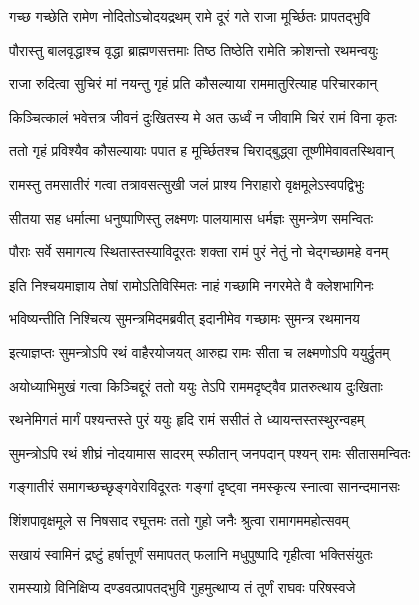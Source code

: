 \twolineshloka
{गच्छ गच्छेति रामेण नोदितोऽचोदयद्रथम्}
{रामे दूरं गते राजा मूर्च्छितः प्रापतद्भुवि} %

\twolineshloka
{पौरास्तु बालवृद्धाश्च वृद्धा ब्राह्मणसत्तमाः}
{तिष्ठ तिष्ठेति रामेति क्रोशन्तो रथमन्वयुः} %

\twolineshloka
{राजा रुदित्वा सुचिरं मां नयन्तु गृहं प्रति}
{कौसल्याया राममातुरित्याह परिचारकान्} %

\twolineshloka
{किञ्चित्कालं भवेत्तत्र जीवनं दुःखितस्य मे}
{अत ऊर्ध्वं न जीवामि चिरं रामं विना कृतः} %

\twolineshloka
{ततो गृहं प्रविश्यैव कौसल्यायाः पपात ह}
{मूर्च्छितश्च चिराद्बुद्ध्वा तूष्णीमेवावतस्थिवान्} %

\twolineshloka
{रामस्तु तमसातीरं गत्वा तत्रावसत्सुखी}
{जलं प्राश्य निराहारो वृक्षमूलेऽस्वपद्विभुः} %

\twolineshloka
{सीतया सह धर्मात्मा धनुष्पाणिस्तु लक्ष्मणः}
{पालयामास धर्मज्ञः सुमन्त्रेण समन्वितः} %

\twolineshloka
{पौराः सर्वे समागत्य स्थितास्तस्याविदूरतः}
{शक्ता रामं पुरं नेतुं नो चेद्गच्छामहे वनम्} %

\twolineshloka
{इति निश्चयमाज्ञाय तेषां रामोऽतिविस्मितः}
{नाहं गच्छामि नगरमेते वै क्लेशभागिनः} %

\twolineshloka
{भविष्यन्तीति निश्चित्य सुमन्त्रमिदमब्रवीत्}
{इदानीमेव गच्छामः सुमन्त्र रथमानय} %

\twolineshloka
{इत्याज्ञप्तः सुमन्त्रोऽपि रथं वाहैरयोजयत्}
{आरुह्य रामः सीता च लक्ष्मणोऽपि ययुर्द्रुतम्} %

\twolineshloka
{अयोध्याभिमुखं गत्वा किञ्चिद्दूरं ततो ययुः}
{तेऽपि राममदृष्ट्वैव प्रातरुत्थाय दुःखिताः} %

\twolineshloka
{रथनेमिगतं मार्गं पश्यन्तस्ते पुरं ययुः}
{हृदि रामं ससीतं ते ध्यायन्तस्तस्थुरन्वहम्} %

\twolineshloka
{सुमन्त्रोऽपि रथं शीघ्रं नोदयामास सादरम्}
{स्फीतान् जनपदान् पश्यन् रामः सीतासमन्वितः} %

\twolineshloka
{गङ्गातीरं समागच्छच्छृङ्गवेराविदूरतः}
{गङ्गां दृष्ट्वा नमस्कृत्य स्नात्वा सानन्दमानसः} %

\twolineshloka
{शिंशपावृक्षमूले स निषसाद रघूत्तमः}
{ततो गुहो जनैः श्रुत्वा रामागममहोत्सवम्} %

\twolineshloka
{सखायं स्वामिनं द्रष्टुं हर्षात्तूर्णं समापतत्}
{फलानि मधुपुष्पादि गृहीत्वा भक्तिसंयुतः} %

\twolineshloka
{रामस्याग्रे विनिक्षिप्य दण्डवत्प्रापतद्भुवि}
{गुहमुत्थाप्य तं तूर्णं राघवः परिषस्वजे} %

